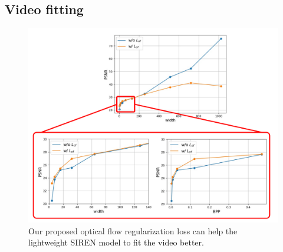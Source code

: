 \documentclass{article}
\begin{document}
\subsection{Video fitting}
\label{sec_video_fit}
\begin{figure}[t]
\centering
\includegraphics[width=1\textwidth]{compression.png}
\caption{Our proposed optical flow regularization loss can help the lightweight SIREN model to fit the video better.}
\end{figure}
\end{document}

